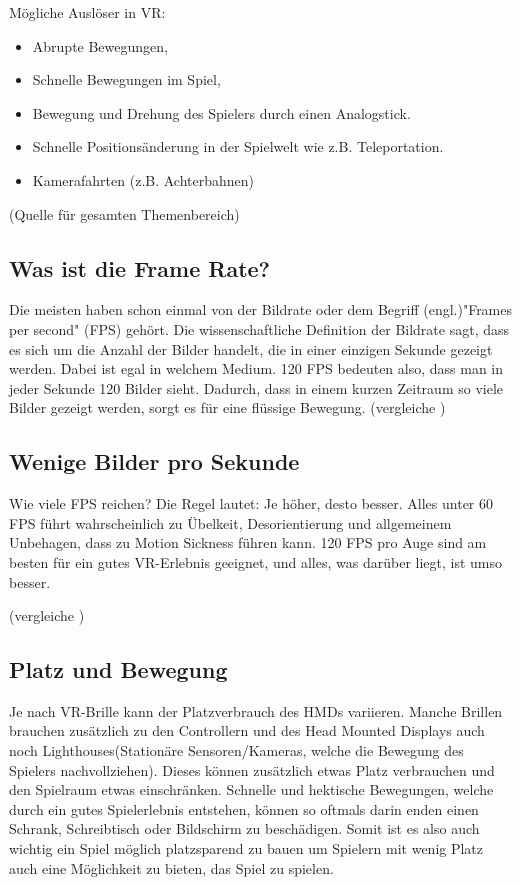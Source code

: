 \vspace{1cm}
Mögliche Auslöser in VR:
\begin{itemize}
	\item Abrupte Bewegungen,
	\item Schnelle Bewegungen im Spiel,
	\item Bewegung und Drehung des Spielers durch einen Analogstick.
	\item Schnelle Positionsänderung in der Spielwelt wie z.B. Teleportation.
	\item Kamerafahrten (z.B. Achterbahnen)
\end{itemize}

(Quelle für gesamten Themenbereich)
\cite{_motionsickness}
\cite{_vr_quovadis}


\subsection{Was ist die Frame Rate?}
Die meisten haben schon einmal von der Bildrate oder dem Begriff (engl.)"Frames per second" (FPS) gehört. Die wissenschaftliche Definition der Bildrate sagt, dass es sich um die Anzahl der Bilder handelt, die in einer einzigen Sekunde gezeigt werden. Dabei ist egal in welchem Medium. 120 FPS bedeuten also, dass man in jeder Sekunde 120 Bilder sieht. Dadurch, dass in einem kurzen Zeitraum so viele Bilder gezeigt werden, sorgt es für eine flüssige Bewegung.
(vergleiche \cite{_vr_linde})

\subsection{Wenige Bilder pro Sekunde}
Wie viele FPS reichen?
Die Regel lautet: Je höher, desto besser. Alles unter 60 FPS führt wahrscheinlich zu Übelkeit, Desorientierung und allgemeinem Unbehagen, dass zu Motion Sickness führen kann. 120 FPS pro Auge sind am besten für ein gutes VR-Erlebnis geeignet, und alles, was darüber liegt, ist umso besser.

(vergleiche \cite{_vr_linde})

\subsection{Platz und Bewegung}
Je nach VR-Brille kann der Platzverbrauch des HMDs variieren. Manche Brillen brauchen zusätzlich zu den Controllern und des Head Mounted Displays auch noch Lighthouses(Stationäre Sensoren/Kameras, welche die Bewegung des Spielers nachvollziehen). Dieses können zusätzlich etwas Platz verbrauchen und den Spielraum etwas einschränken. Schnelle und hektische Bewegungen, welche durch ein gutes Spielerlebnis entstehen, können so oftmals darin enden einen Schrank, Schreibtisch oder Bildschirm zu beschädigen. Somit ist es also auch wichtig ein Spiel möglich platzsparend zu bauen um Spielern mit wenig Platz auch eine Möglichkeit zu bieten, das Spiel zu spielen.

